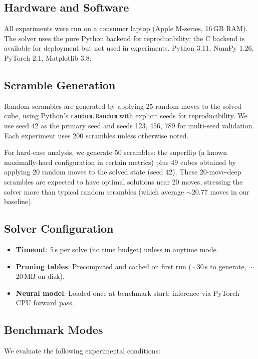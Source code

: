 \documentclass[10pt,twocolumn,a4paper]{article}
\begin{document}
\subsection{Hardware and Software}
All experiments were run on a consumer laptop (Apple M-series, 16\,GB RAM). The solver uses the pure Python backend for reproducibility; the C backend is available for deployment but not used in experiments. Python 3.11, NumPy 1.26, PyTorch 2.1, Matplotlib 3.8.

\subsection{Scramble Generation}
Random scrambles are generated by applying 25 random moves to the solved cube, using Python's \texttt{random.Random} with explicit seeds for reproducibility. We use seed 42 as the primary seed and seeds 123, 456, 789 for multi-seed validation. Each experiment uses 200 scrambles unless otherwise noted.

For hard-case analysis, we generate 50 scrambles: the superflip (a known maximally-hard configuration in certain metrics) plus 49 cubes obtained by applying 20 random moves to the solved state (seed 42). These 20-move-deep scrambles are expected to have optimal solutions near 20 moves, stressing the solver more than typical random scrambles (which average $\sim$20.77 moves in our baseline).

\subsection{Solver Configuration}
\begin{itemize}[leftmargin=*]
  \item \textbf{Timeout}: 5\,s per solve (no time budget) unless in anytime mode.
  \item \textbf{Pruning tables}: Precomputed and cached on first run ($\sim$30\,s to generate, $\sim$20\,MB on disk).
  \item \textbf{Neural model}: Loaded once at benchmark start; inference via PyTorch CPU forward pass.
\end{itemize}

\subsection{Benchmark Modes}
We evaluate the following experimental conditions:
\end{document}
